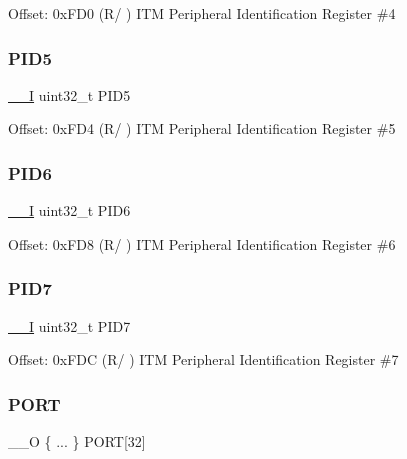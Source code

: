 Offset\+: 0x\+F\+D0 (R/ ) I\+TM Peripheral Identification Register \#4 \mbox{\label{struct_i_t_m___type_a7276a30c464f0b34944b6eb16d3df077}} 
\subsubsection{\texorpdfstring{P\+I\+D5}{PID5}}
{\footnotesize\ttfamily \mbox{\hyperlink{core__cm3_8h_af63697ed9952cc71e1225efe205f6cd3}{\+\_\+\+\_\+I}} uint32\+\_\+t P\+I\+D5}

Offset\+: 0x\+F\+D4 (R/ ) I\+TM Peripheral Identification Register \#5 \mbox{\label{struct_i_t_m___type_ae5d83564471b76d88088a949ca67ac9b}} 
\subsubsection{\texorpdfstring{P\+I\+D6}{PID6}}
{\footnotesize\ttfamily \mbox{\hyperlink{core__cm3_8h_af63697ed9952cc71e1225efe205f6cd3}{\+\_\+\+\_\+I}} uint32\+\_\+t P\+I\+D6}

Offset\+: 0x\+F\+D8 (R/ ) I\+TM Peripheral Identification Register \#6 \mbox{\label{struct_i_t_m___type_a247fae2f4a140d4da5e8a044370dedec}} 
\subsubsection{\texorpdfstring{P\+I\+D7}{PID7}}
{\footnotesize\ttfamily \mbox{\hyperlink{core__cm3_8h_af63697ed9952cc71e1225efe205f6cd3}{\+\_\+\+\_\+I}} uint32\+\_\+t P\+I\+D7}

Offset\+: 0x\+F\+DC (R/ ) I\+TM Peripheral Identification Register \#7 \mbox{\label{struct_i_t_m___type_aca2b00738a4a346efcd8325e18fcfa8a}} 
\subsubsection{\texorpdfstring{P\+O\+RT}{PORT}}
{\footnotesize\ttfamily \+\_\+\+\_\+O \{ ... \}    P\+O\+RT\mbox{[}32\mbox{]}}

